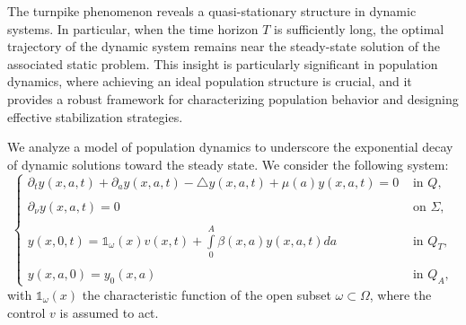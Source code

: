 \documentclass[10pt, a4]{amsart}
\newcounter{assu}
\theoremstyle{plain}
\theoremstyle{definition}
\theoremstyle{remark}
\numberwithin{equation}{section}
\begin{document}
The turnpike phenomenon reveals a quasi-stationary structure in dynamic systems. In particular, when the time horizon \(T\) is sufficiently long, the optimal trajectory of the dynamic system remains near the steady-state solution of the associated static problem. This insight is particularly significant in population dynamics, where achieving an ideal population structure is crucial, and it provides a robust framework for characterizing population behavior and designing effective stabilization strategies.

We analyze a model of population dynamics to underscore the exponential decay of dynamic solutions toward the steady state. We consider the following system:
\begin{equation}\label{eq1.1}
\left\lbrace 
\begin{array}{ll}
\partial_{t}y(x,a,t)+\partial_{a}y(x,a,t)-\triangle y(x,a,t)+\mu(a) y(x,a,t)=0 & \text{ in }  Q,\\
 \\\partial_{\nu}y(x,a,t)=0 &\text{ on }  \Sigma,\\
 \\y(x,0,t)=\mathds{1}_{\omega}(x)v(x,t)+\displaystyle\int\limits_{0}^{A}\beta(x,a)y(x,a,t)da &\text{ in }  Q_{T},\\
 \\y(x,a,0)=y_{0}(x,a)&\text{ in } Q_A,
\end{array}
\right.
\end{equation}
with \( \mathds{1}_{\omega}(x) \) the characteristic function of the open subset \( \omega \subset \Omega \), where the control \( v \) is assumed to act.
\end{document}
